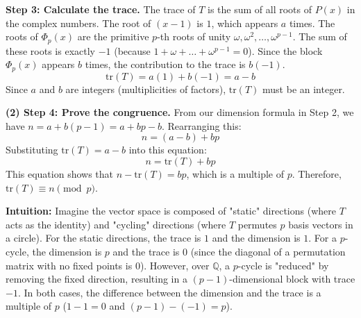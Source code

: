 \begin{solution}
\textbf{Step 3: Calculate the trace.}
The trace of $T$ is the sum of all roots of $P(x)$ in the complex numbers.
The root of $(x-1)$ is $1$, which appears $a$ times.
The roots of $\Phi_p(x)$ are the primitive $p$-th roots of unity $\omega, \omega^2, \dots, \omega^{p-1}$.
The sum of these roots is exactly $-1$ (because $1 + \omega + \dots + \omega^{p-1} = 0$).
Since the block $\Phi_p(x)$ appears $b$ times, the contribution to the trace is $b(-1)$.
\[ \text{tr}(T) = a(1) + b(-1) = a - b \]
Since $a$ and $b$ are integers (multiplicities of factors), $\text{tr}(T)$ must be an integer.

\textbf{(2) Step 4: Prove the congruence.}
From our dimension formula in Step 2, we have $n = a + b(p-1) = a + bp - b$.
Rearranging this:
\[ n = (a - b) + bp \]
Substituting $\text{tr}(T) = a - b$ into this equation:
\[ n = \text{tr}(T) + bp \]
This equation shows that $n - \text{tr}(T) = bp$, which is a multiple of $p$.
Therefore, $\text{tr}(T) \equiv n \pmod p$.

\textbf{Intuition:}
Imagine the vector space is composed of "static" directions (where $T$ acts as the identity) and "cycling" directions (where $T$ permutes $p$ basis vectors in a circle). For the static directions, the trace is $1$ and the dimension is $1$. For a $p$-cycle, the dimension is $p$ and the trace is $0$ (since the diagonal of a permutation matrix with no fixed points is $0$). However, over $\mathbb{Q}$, a $p$-cycle is "reduced" by removing the fixed direction, resulting in a $(p-1)$-dimensional block with trace $-1$. In both cases, the difference between the dimension and the trace is a multiple of $p$ ($1-1=0$ and $(p-1)-(-1)=p$).
\end{solution}

